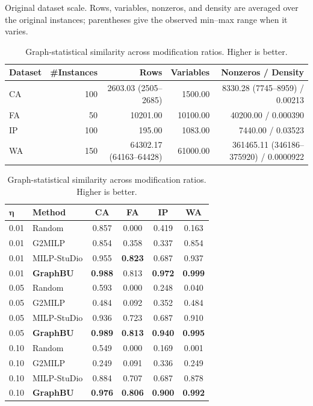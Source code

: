\documentclass[letterpaper]{article}
\newcommand{\method}{\textbf{GraphBU}\xspace}
\begin{document}
\begin{table}[!t]
\centering
\small
\setlength{\tabcolsep}{5pt}
\renewcommand{\arraystretch}{0.98}
\caption{Original dataset scale. Rows, variables, nonzeros, and density are averaged over the original instances; parentheses give the observed min--max range when it varies.}
\label{tab:app_dataset_scale}
\begin{tabular}{@{}lrrrr@{}}
\toprule
\textbf{Dataset} & \textbf{\#Instances} & \textbf{Rows} & \textbf{Variables} & \textbf{Nonzeros / Density} \\
\midrule
CA & 100 & 2603.03 (2505--2685) & 1500.00 & 8330.28 (7745--8959) / 0.00213 \\
FA & 50 & 10201.00 & 10100.00 & 40200.00 / 0.000390 \\
IP & 100 & 195.00 & 1083.00 & 7440.00 / 0.03523 \\
WA & 150 & 64302.17 (64163--64428) & 61000.00 & 361465.11 (346186--375920) / 0.0000922 \\
\bottomrule
\end{tabular}

\vspace{6pt}
\small
\setlength{\tabcolsep}{7pt}
\renewcommand{\arraystretch}{0.98}
\caption{Graph-statistical similarity across modification ratios. Higher is better.}
\label{tab:app_similarity}
\begin{tabular}{@{}llcccc@{}}
\toprule
$\boldsymbol{\eta}$ & \textbf{Method} & \textbf{CA} & \textbf{FA} & \textbf{IP} & \textbf{WA} \\
\midrule
0.01 & Random & 0.857 & 0.000 & 0.419 & 0.163 \\
0.01 & G2MILP & 0.854 & 0.358 & 0.337 & 0.854 \\
0.01 & MILP-StuDio & 0.955 & \textbf{0.823} & 0.687 & 0.937 \\
0.01 & \method & \textbf{0.988} & 0.813 & \textbf{0.972} & \textbf{0.999} \\
\midrule
0.05 & Random & 0.593 & 0.000 & 0.248 & 0.040 \\
0.05 & G2MILP & 0.484 & 0.092 & 0.352 & 0.484 \\
0.05 & MILP-StuDio & 0.936 & 0.723 & 0.687 & 0.910 \\
0.05 & \method & \textbf{0.989} & \textbf{0.813} & \textbf{0.940} & \textbf{0.995} \\
\midrule
0.10 & Random & 0.549 & 0.000 & 0.169 & 0.001 \\
0.10 & G2MILP & 0.249 & 0.091 & 0.336 & 0.249 \\
0.10 & MILP-StuDio & 0.884 & 0.707 & 0.687 & 0.878 \\
0.10 & \method & \textbf{0.976} & \textbf{0.806} & \textbf{0.900} & \textbf{0.992} \\
\bottomrule
\end{tabular}


\end{table}
\end{document}
